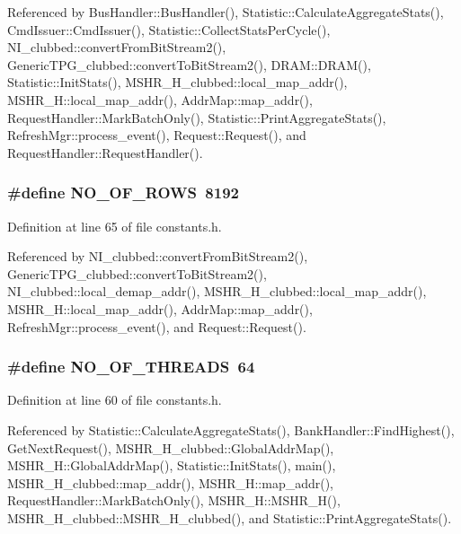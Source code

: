 Referenced by BusHandler::BusHandler(), Statistic::CalculateAggregateStats(), CmdIssuer::CmdIssuer(), Statistic::CollectStatsPerCycle(), NI\_\-clubbed::convertFromBitStream2(), GenericTPG\_\-clubbed::convertToBitStream2(), DRAM::DRAM(), Statistic::InitStats(), MSHR\_\-H\_\-clubbed::local\_\-map\_\-addr(), MSHR\_\-H::local\_\-map\_\-addr(), AddrMap::map\_\-addr(), RequestHandler::MarkBatchOnly(), Statistic::PrintAggregateStats(), RefreshMgr::process\_\-event(), Request::Request(), and RequestHandler::RequestHandler().
\subsubsection[{NO\_\-OF\_\-ROWS}]{\setlength{\rightskip}{0pt plus 5cm}\#define NO\_\-OF\_\-ROWS~8192}\label{constants_8h_0a7e6a7eaff7c02b4098eb1ce3920d20}




Definition at line 65 of file constants.h.

Referenced by NI\_\-clubbed::convertFromBitStream2(), GenericTPG\_\-clubbed::convertToBitStream2(), NI\_\-clubbed::local\_\-demap\_\-addr(), MSHR\_\-H\_\-clubbed::local\_\-map\_\-addr(), MSHR\_\-H::local\_\-map\_\-addr(), AddrMap::map\_\-addr(), RefreshMgr::process\_\-event(), and Request::Request().
\subsubsection[{NO\_\-OF\_\-THREADS}]{\setlength{\rightskip}{0pt plus 5cm}\#define NO\_\-OF\_\-THREADS~64}\label{constants_8h_3f030219b10d33352beebbc28e878f42}




Definition at line 60 of file constants.h.

Referenced by Statistic::CalculateAggregateStats(), BankHandler::FindHighest(), GetNextRequest(), MSHR\_\-H\_\-clubbed::GlobalAddrMap(), MSHR\_\-H::GlobalAddrMap(), Statistic::InitStats(), main(), MSHR\_\-H\_\-clubbed::map\_\-addr(), MSHR\_\-H::map\_\-addr(), RequestHandler::MarkBatchOnly(), MSHR\_\-H::MSHR\_\-H(), MSHR\_\-H\_\-clubbed::MSHR\_\-H\_\-clubbed(), and Statistic::PrintAggregateStats().
